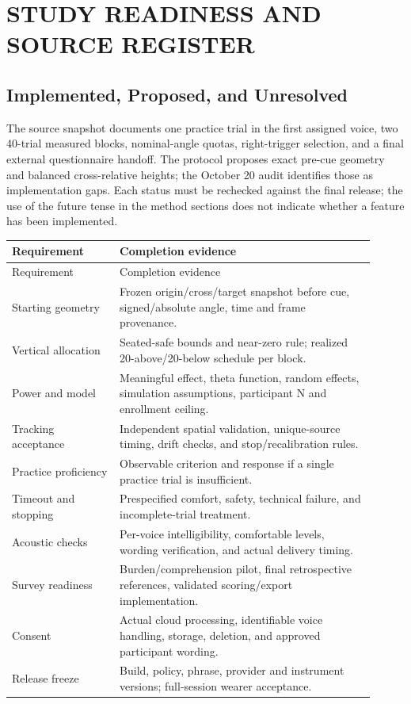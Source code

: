 \chapter{STUDY READINESS AND SOURCE REGISTER}
\label{app:readiness}
\newpage
\section{Implemented, Proposed, and Unresolved}
The source snapshot documents one practice trial in the first assigned voice, two 40-trial measured blocks, nominal-angle quotas, right-trigger selection, and a final external questionnaire handoff. The protocol proposes exact pre-cue geometry and balanced cross-relative heights; the October 20 audit identifies those as implementation gaps. Each status must be rechecked against the final release; the use of the future tense in the method sections does not indicate whether a feature has been implemented.

\begingroup
{}
\begin{longtable}{@{}p{0.27\linewidth}p{0.64\linewidth}@{}}
\toprule
Requirement & Completion evidence \\\midrule\endfirsthead
\toprule Requirement & Completion evidence \\\midrule\endhead
Starting geometry & Frozen origin/cross/target snapshot before cue, signed/absolute angle, time and frame provenance.\\
Vertical allocation & Seated-safe bounds and near-zero rule; realized 20-above/20-below schedule per block.\\
Power and model & Meaningful effect, theta function, random effects, simulation assumptions, participant N and enrollment ceiling.\\
Tracking acceptance & Independent spatial validation, unique-source timing, drift checks, and stop/recalibration rules.\\
Practice proficiency & Observable criterion and response if a single practice trial is insufficient.\\
Timeout and stopping & Prespecified comfort, safety, technical failure, and incomplete-trial treatment.\\
Acoustic checks & Per-voice intelligibility, comfortable levels, wording verification, and actual delivery timing.\\
Survey readiness & Burden/comprehension pilot, final retrospective references, validated scoring/export implementation.\\
Consent & Actual cloud processing, identifiable voice handling, storage, deletion, and approved participant wording.\\
Release freeze & Build, policy, phrase, provider and instrument versions; full-session wearer acceptance.\\\bottomrule
\end{longtable}
\endgroup

